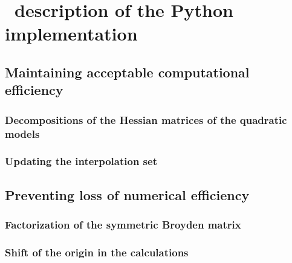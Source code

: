 %
%
%
\chapter{ \textemdash\ description of the Python implementation}

\section{Maintaining acceptable computational efficiency}

\subsection{Decompositions of the Hessian matrices of the quadratic models}

\subsection{Updating the interpolation set}

\section{Preventing loss of numerical efficiency}

\subsection{Factorization of the symmetric Broyden matrix}

\subsection{Shift of the origin in the calculations}
